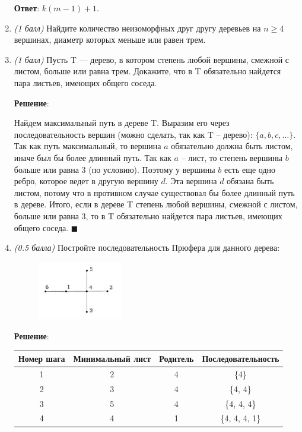 \documentclass{article}
\begin{document}
\begin{enumerate}
    \textbf{Ответ}: $k(m-1)+1$.

    \item \textit{(1 балл)} Найдите количество неизоморфных друг другу деревьев на $n \geq 4$ вершинах, диаметр которых меньше или равен трем.
    \item \textit{(1 балл)} Пусть T — дерево, в котором степень любой вершины, смежной с листом, больше или равна трем. Докажите, что в T обязательно найдется пара листьев, имеющих общего соседа.
    
    \textbf{Решение}:
    
    Найдем максимальный путь в дереве T. Выразим его через последовательность вершин (можно сделать, так как T -- дерево): $\{a, b, c, \dots\}$. Так как путь максимальный, то вершина $a$ обязательно должна быть листом, иначе был бы более длинный путь. Так как $a$ -- лист, то степень вершины $b$ больше или равна 3 (по условию). Поэтому у вершины $b$ есть еще одно ребро, которое ведет в другую вершину $d$. Эта вершина $d$ обязана быть листом, потому что в противном случае существовал бы более длинный путь в дереве. Итого, если в дереве T степень любой вершины, смежной с листом, больше или равна 3, то в T обязательно найдется пара листьев, имеющих общего соседа. $\blacksquare$

    \item \textit{(0.5 балла)} Постройте последовательность Прюфера для данного дерева:
    
    \begin{figure}[h]
        \centering
        \includegraphics[width=0.35\textwidth]{images/12.5.png}
    \end{figure}

    \textbf{Решение}:
    
    \begin{table}[h]
        \centering
        \begin{tabular}{|c|c|c|c|}
            \hline
            Номер шага & Минимальный лист & Родитель & Последовательность \\
            \hline
            1 & 2 & 4 & \{4\} \\
            \hline
            2 & 3 & 4 & \{4, 4\} \\
            \hline
            3 & 5 & 4 & \{4, 4, 4\} \\
            \hline
            4 & 4 & 1 & \{4, 4, 4, 1\} \\
            \hline
        \end{tabular}
    \end{table}
    

\end{enumerate}
\end{document}
